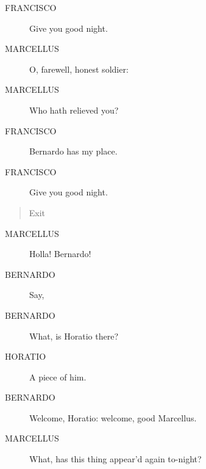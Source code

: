 \documentclass{article}
\begin{document}
\begin{description}
            
\item[FRANCISCO] Give you good night.
\end{description}
          
\begin{description}
            
\item[MARCELLUS] O, farewell, honest soldier:
\item[MARCELLUS] Who hath relieved you?
\end{description}
          
\begin{description}
            
\item[FRANCISCO] Bernardo has my place.
\item[FRANCISCO] Give you good night.
\end{description}
          
\begin{quote}
Exit
\end{quote}
          
\begin{description}
            
\item[MARCELLUS] Holla! Bernardo!
\end{description}
          
\begin{description}
            
\item[BERNARDO] Say,
\item[BERNARDO] What, is Horatio there?
\end{description}
          
\begin{description}
            
\item[HORATIO] A piece of him.
\end{description}
          
\begin{description}
            
\item[BERNARDO] Welcome, Horatio: welcome, good Marcellus.
\end{description}
          
\begin{description}
            
\item[MARCELLUS] What, has this thing appear'd again to-night?
\end{description}
          
\end{document}
